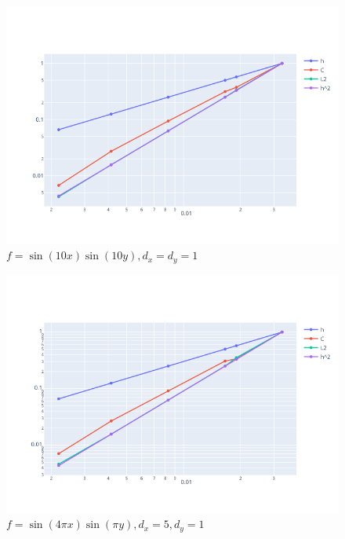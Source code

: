 \documentclass{article}
\begin{document}
\begin{figure}[h!]
	\centering
	\includegraphics[width=.9\textwidth]{img/res2.png}
	\caption{$f = \sin(10 x) \sin(10 y) , d_x = d_y = 1$}
\end{figure}

\begin{figure}[h!]
	\centering
	\includegraphics[width=.9\textwidth]{img/res3.png}
	\caption{ $f = \sin(4 \pi x) \sin(\pi y), d_x = 5, d_y = 1$}
\end{figure}
\end{document}
